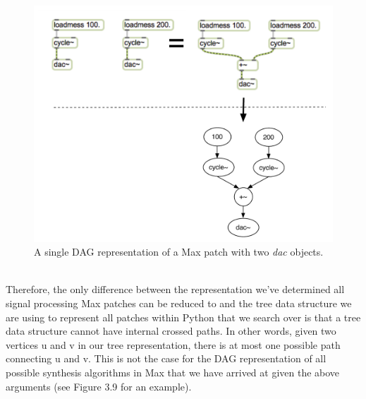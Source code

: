 \documentclass[a4paper,12pt]{report} 	%
\numberwithin{figure}{chapter}
\numberwithin{table}{chapter}
\numberwithin{equation}{chapter}
\begin{document}
\begin{flushleft}
\begin{figure}[h!]
\begin{center}
\includegraphics[scale=0.7]{MaxDAGs2DACs}
\caption[A Single DAG with Two \emph{dac\texttildelow{}} Objects]{A single DAG representation of a Max patch with two \emph{dac\texttildelow{}} objects.}
\end{center}
\end{figure}
\\
Therefore, the only difference between the representation we've determined all signal processing Max patches can be reduced to and the tree data structure we are using to represent all patches within Python that we search over is that a tree data structure cannot have internal crossed paths. In other words, given two vertices u and v in our tree representation, there is at most one possible path connecting u and v. This is not the case for the DAG representation of all possible synthesis algorithms in Max that we have arrived at given the above arguments (see Figure 3.9 for an example).
\begin{figure}[h!]
\begin{center}

\end{center}
\end{figure}
\end{flushleft}
\end{document}
